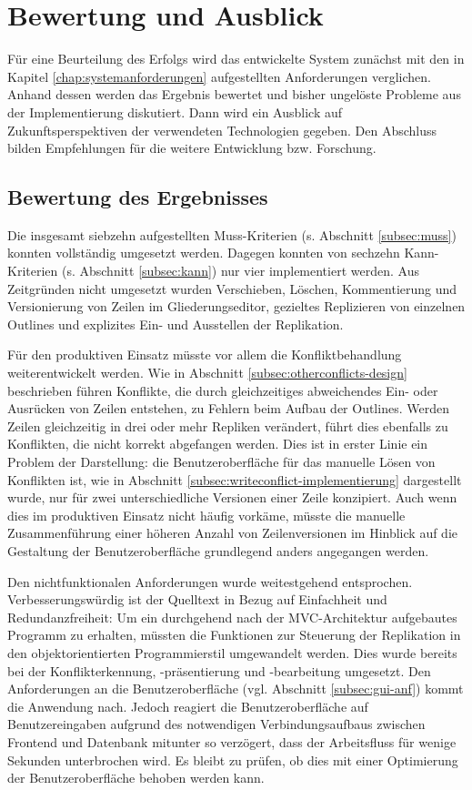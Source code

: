 \chapter{Bewertung und Ausblick}
\label{chap:fazit}

Für eine Beurteilung des Erfolgs wird das entwickelte System zunächst mit den in Kapitel \ref{chap:systemanforderungen} aufgestellten Anforderungen  verglichen. Anhand dessen werden das Ergebnis bewertet und bisher ungelöste Probleme aus der Implementierung diskutiert. Dann wird ein Ausblick auf Zukunftsperspektiven der verwendeten Technologien gegeben. Den Abschluss bilden Empfehlungen für die weitere Entwicklung bzw. Forschung.


\section{Bewertung des Ergebnisses}

Die insgesamt siebzehn aufgestellten Muss-Kriterien (s. Abschnitt \ref{subsec:muss}) konnten vollständig umgesetzt werden. Dagegen konnten von sechzehn Kann-Kriterien (s. Abschnitt \ref{subsec:kann}) nur vier implementiert werden. Aus Zeitgründen nicht umgesetzt wurden Verschieben, Löschen, Kommentierung und Versionierung von Zeilen im Gliederungseditor, gezieltes Replizieren von einzelnen Outlines und explizites Ein- und Ausstellen der Replikation. 

Für den produktiven Einsatz müsste vor allem die Konfliktbehandlung weiterentwickelt werden. Wie in Abschnitt \ref{subsec:otherconflicts-design} beschrieben führen Konflikte, die durch gleichzeitiges abweichendes Ein- oder Ausrücken von Zeilen entstehen, zu Fehlern beim Aufbau der Outlines. Werden Zeilen gleichzeitig in drei oder mehr Repliken verändert, führt dies ebenfalls zu Konflikten, die nicht korrekt abgefangen werden. Dies ist in erster Linie ein Problem der Darstellung: die Benutzeroberfläche für das manuelle Lösen von Konflikten ist, wie in Abschnitt \ref{subsec:writeconflict-implementierung} dargestellt wurde, nur für zwei unterschiedliche Versionen einer Zeile konzipiert. Auch wenn dies im produktiven Einsatz nicht häufig vorkäme, müsste die manuelle Zusammenführung einer höheren Anzahl von Zeilenversionen im Hinblick auf die Gestaltung der Benutzeroberfläche grundlegend anders angegangen werden.

Den nichtfunktionalen Anforderungen wurde weitestgehend entsprochen. Verbesserungswürdig ist der Quelltext in Bezug auf Einfachheit und Redundanzfreiheit: Um ein durchgehend nach der MVC-Architektur aufgebautes Programm zu erhalten, müssten die Funktionen zur Steuerung der Replikation in den objektorientierten Programmierstil umgewandelt werden. Dies wurde bereits bei der Konflikterkennung, -präsentierung und -bearbeitung umgesetzt. Den Anforderungen an die Benutzeroberfläche (vgl. Abschnitt \ref{subsec:gui-anf}) kommt die Anwendung nach. Jedoch reagiert die Benutzeroberfläche auf Benutzereingaben aufgrund des notwendigen Verbindungsaufbaus zwischen Frontend und Datenbank mitunter so verzögert, dass der Arbeitsfluss für wenige Sekunden unterbrochen wird. Es bleibt zu prüfen, ob dies mit einer Optimierung der Benutzeroberfläche behoben werden kann.

